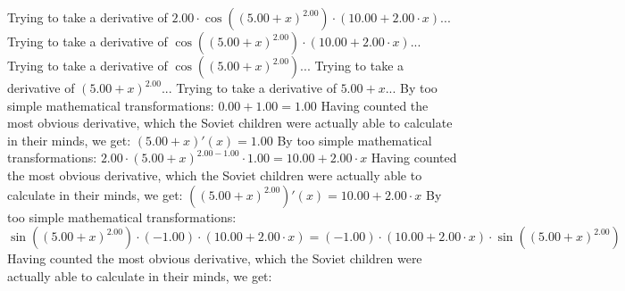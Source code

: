\documentclass{article}
\begin{document}
\newline
Trying to take a derivative of ${{2.00} \cdot { \cos {\left({\left({{5.00} + {x}}\right) ^ {2.00}}\right)}  \cdot \left({{10.00} + {{2.00} \cdot {x}}}\right)}}$...\newline
\newline
Trying to take a derivative of ${ \cos {\left({\left({{5.00} + {x}}\right) ^ {2.00}}\right)}  \cdot \left({{10.00} + {{2.00} \cdot {x}}}\right)}$...\newline
\newline
Trying to take a derivative of $ \cos {\left({\left({{5.00} + {x}}\right) ^ {2.00}}\right)} $...\newline
\newline
Trying to take a derivative of ${\left({{5.00} + {x}}\right) ^ {2.00}}$...\newline
\newline
Trying to take a derivative of ${{5.00} + {x}}$...\newline
\newline
By too simple mathematical transformations:
 ${{0.00} + {1.00}} = {1.00}$ 
 \newline
 \newline 
Having counted the most obvious derivative, which the Soviet children were actually able to calculate in their minds, we get:
$({{5.00} + {x}})'(x) = {1.00}$\newline
\newline
By too simple mathematical transformations:
 ${{{2.00} \cdot {\left({{5.00} + {x}}\right) ^ {{2.00} - {1.00}}}} \cdot {1.00}} = {{10.00} + {{2.00} \cdot {x}}}$ 
 \newline
 \newline 
Having counted the most obvious derivative, which the Soviet children were actually able to calculate in their minds, we get:
$({\left({{5.00} + {x}}\right) ^ {2.00}})'(x) = {{10.00} + {{2.00} \cdot {x}}}$\newline
\newline
By too simple mathematical transformations:
 ${{ \sin {\left({\left({{5.00} + {x}}\right) ^ {2.00}}\right)}  \cdot \left({-1.00}\right)} \cdot \left({{10.00} + {{2.00} \cdot {x}}}\right)} = {\left({-1.00}\right) \cdot {\left({{10.00} + {{2.00} \cdot {x}}}\right) \cdot  \sin {\left({\left({{5.00} + {x}}\right) ^ {2.00}}\right)} }}$ 
 \newline
 \newline 
Having counted the most obvious derivative, which the Soviet children were actually able to calculate in their minds, we get:
\end{document}

